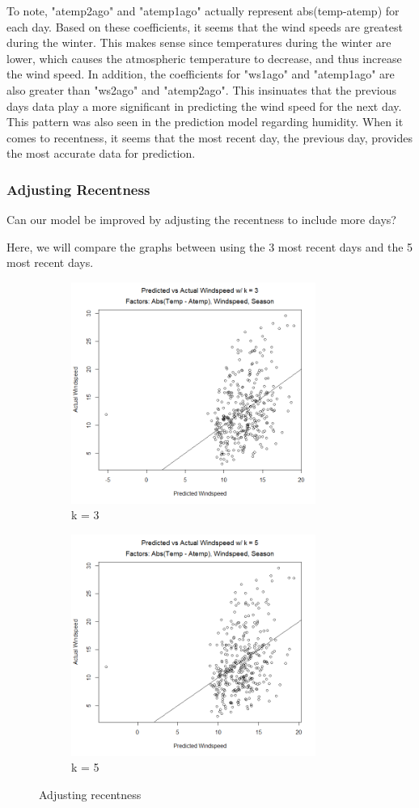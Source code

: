 \documentclass[12pt]{article}
\begin{document}
To note, "atemp2ago" and "atemp1ago" actually represent abs(temp-atemp) for each day.
Based on these coefficients, it seems that the wind speeds are greatest during the winter. This makes sense since temperatures during the winter are lower, which causes the atmospheric temperature to decrease, and thus increase the wind speed. In addition, the coefficients for "ws1ago" and "atemp1ago" are also greater than "ws2ago" and "atemp2ago". This insinuates that the previous days data play a more significant in predicting the wind speed for the next day. This pattern was also seen in the prediction model regarding humidity. When it comes to recentness, it seems that the most recent day, the previous day, provides the most accurate data for prediction.


\subsubsection{Adjusting Recentness}
Can our model be improved by adjusting the recentness to include more days?

Here, we will compare the graphs between using the 3 most recent days and the 5 most recent days.

\begin{figure} [H]
\centering
\begin{subfigure}{.5\textwidth}
  \centering
  \includegraphics[width=80mm]{T-Awk3.png}
  \caption{k = 3}
  \label{fig:wsk3}
\end{subfigure}%
\begin{subfigure}{.5\textwidth}
  \centering
  \includegraphics[width=80mm]{T-Awk5.png}
  \caption{k = 5}
  \label{fig:wsk5}
\end{subfigure}
\caption{Adjusting recentness}
\label{fig:3vs5}
\end{figure}
\end{document}
